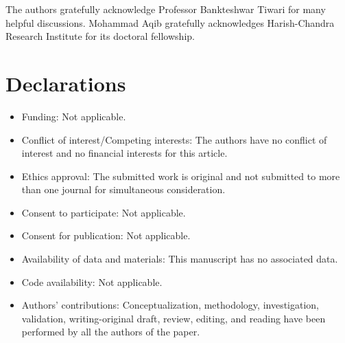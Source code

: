 \documentclass[pdflatex,sn-mathphys-num]{sn-jnl}%
\theoremstyle{thmstyleone}%
\theoremstyle{thmstyletwo}%
\theoremstyle{thmstylethree}%
\begin{document}
\vspace{0.4in}
	


The authors gratefully acknowledge Professor Bankteshwar Tiwari for many helpful discussions. Mohammad Aqib gratefully acknowledges  Harish-Chandra Research Institute for its doctoral fellowship. 

\section*{Declarations}

\begin{itemize}
\item Funding: Not applicable.

\item Conflict of interest/Competing interests: The authors have no conflict of interest and no financial interests for this article.

\item Ethics approval: The submitted work is original and not submitted to more than one journal for simultaneous consideration.

\item Consent to participate: Not applicable.

\item Consent for publication: Not applicable.

\item Availability of data and materials: This manuscript has no associated data.

\item Code availability: Not applicable.

\item Authors' contributions: Conceptualization, methodology, investigation, validation, writing-original draft, review, editing, and reading have been performed by all the authors of the paper.

\end{itemize}










\end{document}
